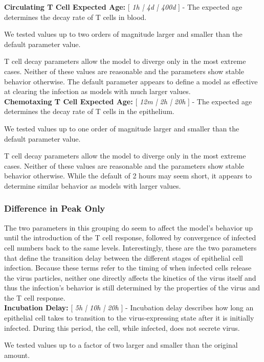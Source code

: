 \documentclass[10pt]{article}
\begin{document}
\textbf{Circulating T Cell Expected Age:} [ \textit{1h |  4d | 400d} ] - The expected age determines the decay rate of T cells in blood.  

We tested values up to two orders of magnitude larger and smaller than the default parameter value.

T cell decay parameters allow the model to diverge only in the most extreme cases.  Neither of these values are reasonable and the parameters show stable behavior otherwise.  The default parameter appears to define a model as effective at clearing the infection as models with much larger values. \\


\textbf{Chemotaxing T Cell Expected Age:} [ \textit{12m | 2h | 20h} ] - The expected age determines the decay rate of T cells in the epithelium.  

We tested values up to one order of magnitude larger and smaller than the default parameter value.

T cell decay parameters allow the model to diverge only in the most extreme cases.  Neither of these values are reasonable and the parameters show stable behavior otherwise.  While the default of 2 hours may seem short, it appears to determine similar behavior as models with larger values.

\subsubsection{Difference in Peak Only} 

The two parameters in this grouping do seem to affect the model's behavior up until the introduction of the T cell response, followed by convergence of infected cell numbers back to the same levels.  Interestingly, these are the two parameters that define the transition delay between the different stages of epithelial cell infection. Because these terms refer to the timing of when infected cells release the virus particles, neither one directly affects the kinetics of the virus itself and thus the infection's behavior is still determined by the properties of the virus and the T cell response. \\


\textbf{Incubation Delay:} [ \textit{5h | 10h | 20h} ] - Incubation delay describes how long an epithelial cell takes to transition to the virus-expressing state after it is initially infected.  During this period, the cell, while infected, does not secrete virus.

We tested values up to a factor of two larger and smaller than the original amount.  
\end{document}

